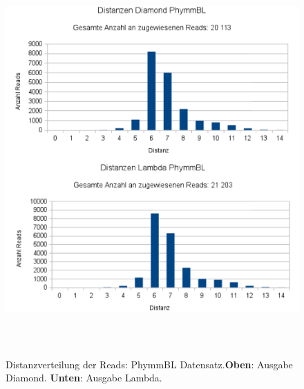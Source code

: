\documentclass[10pt, a4paper]{article}[08.12.2015]
\begin{document}
     \begin{figure}[H]
      \centering
      \noindent\includegraphics[width=\linewidth,height=15cm,
      keepaspectratio]{Abbildungen/PhymmBL_Distanzen_both.png}
      \caption[Distanzverteilung der Reads: PhymmBL Datensatz.]{\small{Distanzverteilung der Reads: PhymmBL Datensatz.\newline \textbf{Oben}: Ausgabe Diamond. \textbf{Unten}: Ausgabe Lambda.}}
    \end{figure}
    
\end{document}
